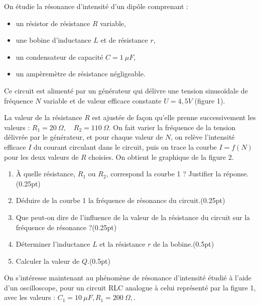 \documentclass[12pt]{article}
\begin{document}
On étudie la résonance d’intensité d’un dipôle comprenant :
\begin{itemize}
    \item un résistor de résistance $R$ variable,
    \item une bobine d’inductance $L$ et de résistance $r$,
    \item un condensateur de capacité $C = 1\ \mu F$,
    \item un ampèremètre de résistance négligeable.
\end{itemize}

Ce circuit est alimenté par un générateur qui délivre une tension sinusoïdale de fréquence $N$ variable et de valeur efficace constante $U = 4,5V$ (figure 1).

La valeur de la résistance $R$ est ajustée de façon qu’elle prenne successivement les valeurs :
$R_1 = 20\ \Omega, \quad R_2 = 110\ \Omega$.
On fait varier la fréquence de la tension délivrée par le générateur, et pour chaque valeur de $N$, on relève l’intensité efficace $I$ du courant circulant dans le circuit, puis on trace la courbe $I = f(N)$ pour les deux valeurs de $R$ choisies. On obtient le graphique de la figure 2.

\begin{enumerate}
  \item À quelle résistance, $R_1$ ou $R_2$, correspond la courbe 1 ? Justifier la réponse.\dotfill(0.25pt)
  \item Déduire de la courbe 1 la fréquence de résonance du circuit.\dotfill(0.25pt)
  \item Que peut-on dire de l’influence de la valeur de la résistance du circuit sur la fréquence de résonance ?\dotfill(0.25pt)
  \item Déterminer l’inductance $L$ et la résistance $r$ de la bobine.\dotfill(0.5pt)
  \item Calculer la valeur de $Q$.\dotfill(0.5pt)
\end{enumerate}

On s’intéresse maintenant au phénomène de résonance d’intensité étudié à l’aide d’un oscilloscope, pour un circuit RLC analogue à celui représenté par la figure 1, avec les valeurs : $C_1 = 10\ \mu F, R_1 = 200\ \Omega,$.
\end{document}
